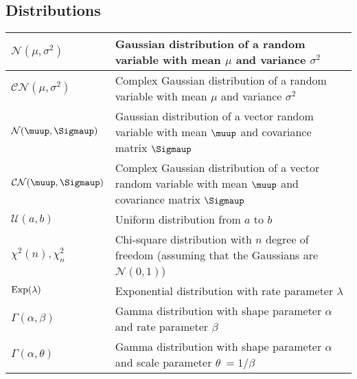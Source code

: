 \subsection{Distributions}
\begin{xltabular}{\textwidth}{XX}
	\(\mathcal{N}(\mu, \sigma^2)\)                                & Gaussian distribution of a random variable with mean \(\mu\) and variance \(\sigma^{2}\)                                                                           \\ \hline
	\(\mathcal{CN}(\mu, \sigma^2)\)                               & Complex Gaussian distribution of a random variable with mean \(\mu\) and variance \(\sigma^{2}\)                                                                   \\ \hline
	\(\mathcal{N}(\boldsymbol{\muup}, \boldsymbol{\Sigmaup})\)    & Gaussian distribution of a vector random variable with mean \(\boldsymbol{\muup}\) and covariance matrix \(\boldsymbol{\Sigmaup}\)                                 \\ \hline
	\(\mathcal{CN}(\boldsymbol{\muup}, \boldsymbol{\Sigmaup})\)   & Complex Gaussian distribution of a vector random variable with mean \(\boldsymbol{\muup}\) and covariance matrix \(\boldsymbol{\Sigmaup}\)                         \\ \hline
	\(\mathcal{U}(a,b)\)                                          & Uniform distribution from \(a\) to \(b\)                                                                                                                           \\ \hline
	\(\chi^2 (n), \chi^2_n\)                                      & Chi-square distribution with \(n\) degree of freedom (assuming that the Gaussians are \(\mathcal{N}(0,1)\))                                                        \\ \hline
	\(\textnormal{Exp}(\lambda)\)                                 & Exponential distribution with rate parameter \(\lambda\)                                                                                                           \\ \hline
	\(\Gamma(\alpha, \beta)\)                                     & Gamma distribution with shape parameter \(\alpha\) and rate parameter \(\beta\)                                                                                    \\ \hline
	\(\Gamma(\alpha, \theta)\)                                    & Gamma distribution with shape parameter \(\alpha\) and scale parameter \(\theta\ = 1/\beta\)                                                                       \\ \hline

\end{xltabular}
